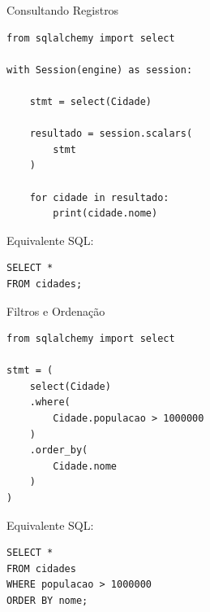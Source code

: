 \documentclass{beamer}
\begin{document}
\begin{frame}[fragile]{Consultando Registros}

\begin{verbatim}
from sqlalchemy import select

with Session(engine) as session:

    stmt = select(Cidade)

    resultado = session.scalars(
        stmt
    )

    for cidade in resultado:
        print(cidade.nome)
\end{verbatim}

\vspace{0.3cm}

Equivalente SQL:

\begin{verbatim}
SELECT *
FROM cidades;
\end{verbatim}

\end{frame}

\begin{frame}[fragile]{Filtros e Ordenação}

\begin{verbatim}
from sqlalchemy import select

stmt = (
    select(Cidade)
    .where(
        Cidade.populacao > 1000000
    )
    .order_by(
        Cidade.nome
    )
)
\end{verbatim}

\vspace{0.3cm}

Equivalente SQL:

\begin{verbatim}
SELECT *
FROM cidades
WHERE populacao > 1000000
ORDER BY nome;
\end{verbatim}

\end{frame}
\end{document}
